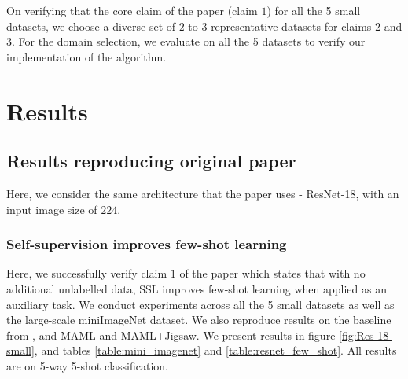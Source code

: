 On verifying that the core claim of the paper (claim $1$) for all the 5 small datasets, we choose a diverse set of $2$ to $3$ representative datasets for claims $2$ and $3$. For the domain selection, we evaluate on all the 5 datasets to verify our implementation of the algorithm.

\section{Results}
\label{sec:results}
\subsection{Results reproducing original paper}
Here, we consider the same architecture that the paper uses - ResNet-18, with an input image size of $224$.
\subsubsection{Self-supervision improves few-shot learning}
Here, we successfully verify claim $1$ of the paper which states that with no additional unlabelled data, SSL improves few-shot learning when applied as an auxiliary task. We conduct experiments across all the 5 small datasets as well as the large-scale miniImageNet dataset. We also reproduce results on the baseline from \cite{chen2018a}, and MAML and MAML+Jigsaw. We present results in figure \ref{fig:Res-18-small}, and tables \ref{table:mini_imagenet} and \ref{table:resnet_few_shot}. All results are on 5-way 5-shot classification.

